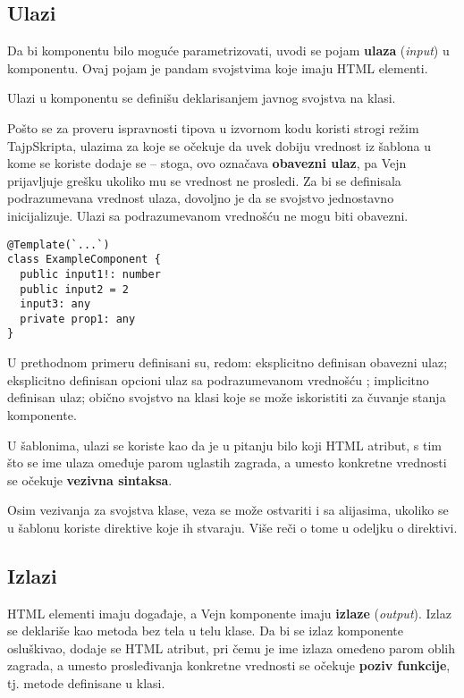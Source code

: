 \subsection{Ulazi}

Da bi komponentu bilo moguće parametrizovati, uvodi se pojam  \textbf{ulaza} (\textsl{input}) u komponentu.
Ovaj pojam je pandam svojstvima koje imaju HTML elementi.

Ulazi u komponentu se definišu deklarisanjem javnog svojstva na klasi.

Pošto se za proveru ispravnosti tipova u izvornom kodu koristi strogi režim TajpSkripta, ulazima za koje se očekuje da uvek dobiju vrednost iz šablona u kome se koriste dodaje se \code{!} -- stoga, ovo označava \textbf{obavezni ulaz}, pa Vejn prijavljuje grešku ukoliko mu se vrednost ne prosledi.
Za bi se definisala podrazumevana vrednost ulaza, dovoljno je da se svojstvo jednostavno inicijalizuje.
Ulazi sa podrazumevanom vrednošću ne mogu biti obavezni.

\begin{verbatim}
@Template(`...`)
class ExampleComponent {
  public input1!: number
  public input2 = 2
  input3: any
  private prop1: any
}
\end{verbatim}

U prethodnom primeru definisani su, redom: eksplicitno definisan obavezni ulaz; eksplicitno definisan opcioni ulaz sa podrazumevanom vrednošću ; implicitno definisan ulaz; obično svojstvo na klasi koje se može iskoristiti za čuvanje stanja komponente.

U šablonima, ulazi se koriste kao da je u pitanju bilo koji HTML atribut, s tim što se ime ulaza omeđuje parom uglastih zagrada, a umesto konkretne vrednosti se očekuje \textbf{vezivna sintaksa}.

Osim vezivanja za svojstva klase, veza se može ostvariti i sa alijasima, ukoliko se u šablonu koriste direktive koje ih stvaraju.
Više reči o tome u odeljku o  direktivi.

\subsection{Izlazi}

HTML elementi imaju događaje, a Vejn komponente imaju \textbf{izlaze} (\textsl{output}).
Izlaz se deklariše kao metoda bez tela u telu klase.
Da bi se izlaz komponente osluškivao, dodaje se HTML atribut, pri čemu je ime izlaza omeđeno parom oblih zagrada, a umesto prosleđivanja konkretne vrednosti se očekuje \textbf{poziv funkcije}, tj. metode definisane u klasi.

